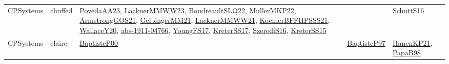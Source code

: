 {\begin{longtable}{llp{6cm}p{6cm}p{6cm}}
CPSystems & chuffed & \href{papers/PovedaAA23.pdf}{PovedaAA23}\cite{PovedaAA23}, \href{articles/LacknerMMWW23.pdf}{LacknerMMWW23}\cite{LacknerMMWW23}, \href{papers/BoudreaultSLQ22.pdf}{BoudreaultSLQ22}\cite{BoudreaultSLQ22}, \href{articles/MullerMKP22.pdf}{MullerMKP22}\cite{MullerMKP22}, \href{papers/ArmstrongGOS21.pdf}{ArmstrongGOS21}\cite{ArmstrongGOS21}, \href{papers/GeibingerMM21.pdf}{GeibingerMM21}\cite{GeibingerMM21}, \href{papers/LacknerMMWW21.pdf}{LacknerMMWW21}\cite{LacknerMMWW21}, \href{articles/KoehlerBFFHPSSS21.pdf}{KoehlerBFFHPSSS21}\cite{KoehlerBFFHPSSS21}, \href{articles/WallaceY20.pdf}{WallaceY20}\cite{WallaceY20}, \href{articles/abs-1911-04766.pdf}{abs-1911-04766}\cite{abs-1911-04766}, \href{papers/YoungFS17.pdf}{YoungFS17}\cite{YoungFS17}, \href{articles/KreterSS17.pdf}{KreterSS17}\cite{KreterSS17}, \href{papers/SzerediS16.pdf}{SzerediS16}\cite{SzerediS16}, \href{papers/KreterSS15.pdf}{KreterSS15}\cite{KreterSS15} &  & \href{papers/SchuttS16.pdf}{SchuttS16}\cite{SchuttS16}\\
CPSystems & claire & \href{articles/BaptisteP00.pdf}{BaptisteP00}\cite{BaptisteP00} & \href{papers/BaptisteP97.pdf}{BaptisteP97}\cite{BaptisteP97} & \href{papers/HanenKP21.pdf}{HanenKP21}\cite{HanenKP21}, \href{articles/PapaB98.pdf}{PapaB98}\cite{PapaB98}\\

\end{longtable}}
